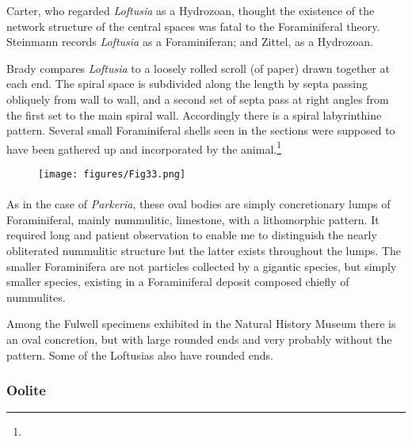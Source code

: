 \documentclass[a4paper, 12pt, oneside]{article}
\begin{document}
Carter, who regarded \emph{Loftusia} as a Hydrozoan, thought the existence of the network structure of the central spaces was fatal to the Foraminiferal theory. Steinmann records \emph{Loftusia} as a Foraminiferan; and Zittel, as a Hydrozoan.

Brady compares \emph{Loftusia} to a loosely rolled scroll (of paper) drawn together at each end. The spiral space is subdivided along the length by septa passing obliquely from wall to wall, and a second set of septa pass at right angles from the first set to the main spiral wall. Accordingly there is a spiral labyrinthine pattern. Several small Foraminiferal shells seen in the sections were supposed to have been gathered up and incorporated by the animal.\footnote{}
\begin{figure}[H]
\centering
\texttt{[image: figures/Fig33.png]}
\caption*{}
\end{figure}
\paragraph{}
As in the case of \emph{Parkeria}, these oval bodies are simply concretionary lumps of Foraminiferal, mainly nummulitic, limestone, with a lithomorphic pattern. It required long and patient observation to enable me to distinguish the nearly obliterated nummulitic structure but the latter exists throughout the lumps. The smaller Foraminifera are not particles collected by a gigantic species, but simply smaller species, existing in a Foraminiferal deposit composed chiefly of nummulites.

Among the Fulwell specimens exhibited in the Natural History Museum there is an oval concretion, but with large rounded ends and very probably without the pattern. Some of the Loftusias also have rounded ends.

\subsubsection{Oolite}
\end{document}
